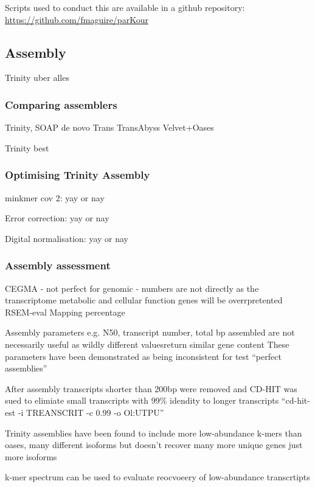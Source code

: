 Scripts used to conduct this are available in a github repository:
\url{https://github.com/fmaguire/parKour}



\subsection{Assembly}

Trinity uber alles

\subsubsection{Comparing assemblers}
Trinity,
SOAP de novo Trans
TransAbyss
Velvet+Oases

Trinity best

\subsubsection{Optimising Trinity Assembly}

minkmer cov 2: yay or nay

Error correction: yay or nay

Digital normalisation: yay or nay

\subsubsection{Assembly assessment}
CEGMA - not perfect for genomic - numbers are not directly as the transcriptome metabolic and cellular function
genes will be overrpretented 
RSEM-eval
Mapping percentage


Assembly parameters e.g. N50, transcript number, total bp assembled are not necessarily useful
as wildly different valuesreturn similar gene content \citep{Lowe2014}
These parameters have been demonstrated as being inconsistent for test ``perfect assemblies'' 





After assembly transcripts shorter than 200bp were removed and CD-HIT was sued to elimiate small 
transcripts with 99\% idendity to longer transcripts  ``cd-hit-est -i TREANSCRIT -c 0.99 -o Ol:UTPU''


Trinity assemblies have been found to include more low-abundance k-mers than oases, many different isoforms
but doesn't recover many more unique genes just more isoforms \citep{Lowe2014} 

k-mer spectrum can be used to evaluate reocvoeery of low-abundance transcrtipts \citep{Pop2009}





